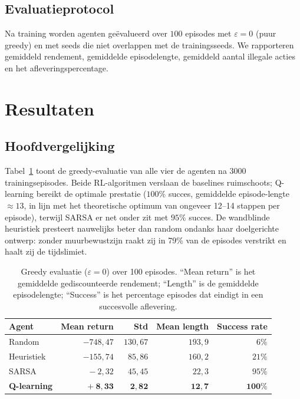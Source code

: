 \documentclass[11pt,a4paper]{article}
\begin{document}
\subsection{Evaluatieprotocol}

Na training worden agenten ge\"evalueerd over $100$ episodes met
$\varepsilon = 0$ (puur greedy) en met seeds die niet overlappen met de
trainingsseeds. We rapporteren gemiddeld rendement, gemiddelde
episodelengte, gemiddeld aantal illegale acties en het
afleveringspercentage.

\section{Resultaten}
\label{sec:results}

\subsection{Hoofdvergelijking}

Tabel~\ref{tab:main} toont de greedy-evaluatie van alle vier de agenten
na 3000 trainings\-episodes. Beide RL-algoritmen verslaan de baselines
ruimschoots; Q-learning bereikt de optimale prestatie ($100\%$ succes,
gemiddelde episode-lengte $\approx 13$, in lijn met het theoretische
optimum van ongeveer 12--14 stappen per episode), terwijl SARSA er net
onder zit met $95\%$ succes. De wandblinde heuristiek presteert
nauwelijks beter dan random ondanks haar doelgerichte ontwerp: zonder
muur\-bewustzijn raakt zij in 79\% van de episodes verstrikt en haalt
zij de tijdslimiet.

\begin{table}[H]
\centering
\caption{Greedy evaluatie ($\varepsilon=0$) over 100 episodes.
``Mean return'' is het gemiddelde gediscounteerde rendement;
``Length'' is de gemiddelde episodelengte;
``Success'' is het percentage episodes dat eindigt in een succesvolle
aflevering.}
\label{tab:main}
\begin{tabular}{lrrrr}
\toprule
Agent & Mean return & Std & Mean length & Success rate \\
\midrule
Random            & $-748{,}47$ & $130{,}67$ & $193{,}9$ & $\phantom{0}6\%$ \\
Heuristiek        & $-155{,}74$ & $\phantom{0}85{,}86$ & $160{,}2$ & $21\%$ \\
SARSA             & $\phantom{-00}-2{,}32$ & $\phantom{0}45{,}45$ & $\phantom{0}22{,}3$ & $95\%$ \\
\textbf{Q-learning} & $\phantom{-00}+\mathbf{8{,}33}$ & $\phantom{00}\mathbf{2{,}82}$ & $\phantom{0}\mathbf{12{,}7}$ & $\mathbf{100\%}$ \\
\bottomrule
\end{tabular}
\end{table}
\end{document}
